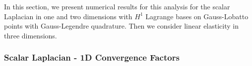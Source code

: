 In this section, we present numerical results for this analysis for the scalar Laplacian in one and two dimensions with $H^1$ Lagrange bases on Gauss-Lobatto points with Gauss-Legendre quadrature.
Then we consider linear elasticity in three dimensions.

\subsubsection{Scalar Laplacian - 1D Convergence Factors}\label{sec:1dresults}


